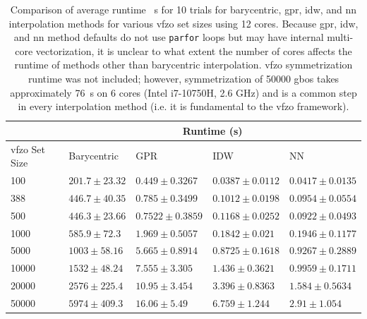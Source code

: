 \documentclass[final,twocolumn,12pt]{elsarticle}
\newcommand{\symtime}{76}
\begin{document}
\begin{table}[]
\centering
\caption{Comparison of average runtime \SI{}{\second} for \num{10} trials for barycentric, \gls{gpr}, \gls{idw}, and \gls{nn} interpolation methods for various \gls{vfzo} set sizes using 12 cores. Because \gls{gpr}, \gls{idw}, and \gls{nn} method defaults do not use \texttt{parfor} loops but may have internal multi-core vectorization, it is unclear to what extent the number of cores affects the runtime of methods other than barycentric interpolation. \Gls{vfzo} symmetrization runtime was not included; however, symmetrization of \num{50000} \glspl{gbo} takes approximately \SI{\symtime}{\second} on 6 cores (Intel i7-10750H, 2.6 GHz) and is a common step in every interpolation method (i.e. it is fundamental to the \gls{vfzo} framework).}
\label{tab:runtime}
\begin{tabular}{@{}lllll@{}}
\cmidrule(l){2-5}
                    & \multicolumn{4}{c}{Runtime (s)}                                                    \\ \midrule
\gls{vfzo} Set Size & Barycentric       & GPR                & IDW                 & NN                  \\ \midrule
\num{100}           & $201.7 \pm 23.32$ & $0.449 \pm 0.3267$ & $0.0387 \pm 0.0112$ & $0.0417 \pm 0.0135$ \\
\num{388}           & $446.7 \pm 40.35$ & $0.785 \pm 0.3499$ & $0.1012 \pm 0.0198$ & $0.0954 \pm 0.0554$ \\
\num{500} & $446.3 \pm 23.66$ & $0.7522 \pm 0.3859$ & $0.1168 \pm 0.0252$ & $0.0922 \pm 0.0493$ \\
\num{1000}          & $585.9 \pm 72.3$  & $1.969 \pm 0.5057$ & $0.1842 \pm 0.021$  & $0.1946 \pm 0.1177$ \\
\num{5000}          & $1003 \pm 58.16$  & $5.665 \pm 0.8914$ & $0.8725 \pm 0.1618$ & $0.9267 \pm 0.2889$ \\
\num{10000}         & $1532 \pm 48.24$  & $7.555 \pm 3.305$  & $1.436 \pm 0.3621$  & $0.9959 \pm 0.1711$ \\
\num{20000}         & $2576 \pm 225.4$  & $10.95 \pm 3.454$  & $3.396 \pm 0.8363$  & $1.584 \pm 0.5634$  \\
\num{50000}         & $5974 \pm 409.3$  & $16.06 \pm 5.49$   & $6.759 \pm 1.244$   & $2.91 \pm 1.054$    \\ \bottomrule
\end{tabular}
\end{table}
\end{document}
